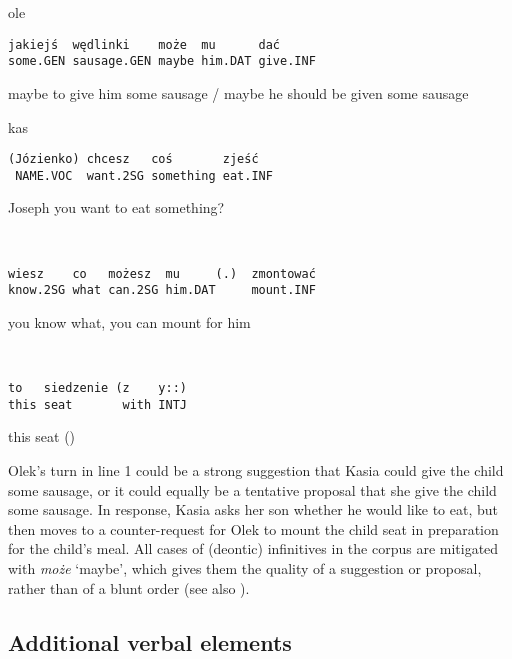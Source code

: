 \documentclass[output=paper]{langsci/langscibook}
\begin{document}
\vspace{-1mm}
%
\begin{mdframednoverticalspace}[style=firstfoc]
\begin{transbox}{1}{ole}
\begin{verbatim}
jakiejś  wędlinki    może  mu      dać
some.GEN sausage.GEN maybe him.DAT give.INF
\end{verbatim}
maybe to give him some sausage / maybe he should be given some sausage
\end{transbox}
\end{mdframednoverticalspace}
%
\begin{mdframednoverticalspace}[style=secondfoc]
\begin{transbox}{2}{kas}
\begin{verbatim}
(Józienko) chcesz   coś       zjeść
 NAME.VOC  want.2SG something eat.INF
\end{verbatim}
Joseph you want to eat something?
\end{transbox}
\end{mdframednoverticalspace}
%
\begin{transbox}{3}{~}
\begin{verbatim}
wiesz    co   możesz  mu     (.)  zmontować
know.2SG what can.2SG him.DAT     mount.INF
\end{verbatim}
you know what, you can mount for him
\end{transbox}
%
\begin{transbox}{4}{~}
\begin{verbatim}
to   siedzenie (z    y::)
this seat       with INTJ
\end{verbatim}
this seat (\hspace{0.8cm})
\end{transbox}\bigskip

Olek’s turn in line 1 could be a strong suggestion that Kasia could give the child some sausage, or it could equally be a tentative proposal that she give the child some sausage. In response, Kasia asks her son whether he would like to eat, but then moves to a counter-request for Olek to mount the child seat in preparation for the child’s meal.  All cases of (deontic) infinitives in the corpus are mitigated with \textit{może} `maybe', which gives them the quality of a suggestion or proposal, rather than of a blunt order (see also \citealt{Wierzbicka1991,Krolakrudnicka2006}).

\subsection{Additional verbal elements}
\end{document}
